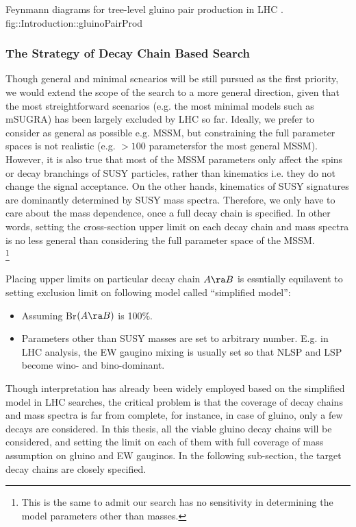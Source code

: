 
{Feynmann diagrams for tree-level gluino pair production in LHC \cite{gluinoSquarkLHC}.}
{fig::Introduction::gluinoPairProd}

\clearpage
\subsubsection{The Strategy of Decay Chain Based Search}
Though general and minimal scnearios will be still pursued as the first priority, 
we would extend the scope of the search to a more general direction,
given that the most streightforward scenarios (e.g. the most minimal models such as mSUGRA) has been largely excluded by LHC so far.
Ideally, we prefer to consider as general as possible e.g. MSSM, but constraining the full parameter spaces is not realistic (e.g. $>100$ parametersfor the most general MSSM).
However, it is also true that most of the MSSM parameters only affect the spins or decay branchings of SUSY particles, rather than kinematics i.e. they do not change the signal acceptance. On the other hands, kinematics of SUSY signatures are dominantly determined by SUSY mass spectra. Therefore, we only have to care about the mass dependence, once a full decay chain is specified. In other words, setting the cross-section upper limit on each decay chain and mass spectra is no less general than considering the full parameter space of the MSSM.  \\
\footnote{This is the same to admit our search has no sensitivity in determining the model parameters other than masses. }

Placing upper limits on particular decay chain $A\ra B$ is essntially equilavent to setting exclusion limit on following model called ``simplified model'':
\begin{itemize}
\item Assuming Br$(A \ra B)$ is 100$\%$.
\item Parameters other than SUSY masses are set to arbitrary number. E.g. in LHC analysis, the EW gaugino mixing is usually set so that NLSP and LSP become wino- and bino-dominant. 
\end{itemize}
Though interpretation has already been widely employed based on the simplified model in LHC searches, the critical problem is that the coverage of decay chains and mass spectra is far from complete, for instance, in case of gluino, only a few decays are considered. In this thesis, all the viable gluino decay chains will be considered, and setting the limit on each of them with full coverage of mass assumption on gluino and EW gauginos. In the following sub-section, the target decay chains are closely specified.

